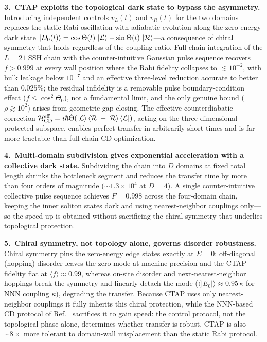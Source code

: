 \documentclass[
  reprint,
  amsmath,
  amssymb,
  aps,
  prb,
  floatfix,
  longbibliography,
]{revtex4-2}
\newcommand{\ketL}{\ket{\mathcal{L}}}
\newcommand{\ketR}{\ket{\mathcal{R}}}
\begin{document}
\textbf{3.~CTAP exploits the topological dark state to bypass the asymmetry.}
Introducing independent controls $v_L(t)$ and $v_R(t)$ for the two domains
replaces the static Rabi oscillation with adiabatic evolution along the
zero-energy dark state $\ket{D_0(t)} = \cos\Theta(t)\,\ketL -
\sin\Theta(t)\,\ketR$---a consequence of chiral symmetry that holds
regardless of the coupling ratio.
Full-chain integration of the $L=21$ SSH chain with the counter-intuitive
Gaussian pulse sequence recovers $f > 0.999$ at every wall position where the
Rabi fidelity collapses to $\lesssim10^{-2}$, with bulk leakage below
$10^{-7}$ and an effective three-level reduction accurate to better than
$0.025\%$; the residual infidelity is a removable pulse boundary-condition
effect ($f \leq \cos^2\Theta_0$), not a fundamental limit, and the only
genuine bound ($\rho \gtrsim 10^2$) arises from geometric gap closing.
The effective counterdiabatic correction
$\mathcal{H}_{\mathrm{CD}}^{\mathrm{eff}} = i\hbar\dot{\Theta}
(\ketL\bra{\mathcal{R}} - \ketR\bra{\mathcal{L}})$, acting on the
three-dimensional protected subspace, enables perfect transfer in arbitrarily
short times and is far more tractable than full-chain CD optimization.

\textbf{4.~Multi-domain subdivision gives exponential acceleration with a
collective dark state.}
Subdividing the chain into $D$ domains at fixed total length shrinks the
bottleneck segment and reduces the transfer time by more than four orders
of magnitude ($\sim\!1.3\times10^4$ at $D = 4$).
A single counter-intuitive collective pulse sequence achieves $F = 0.998$
across the four-domain chain, keeping the inner soliton states dark and
using nearest-neighbor couplings only---so the speed-up is obtained without
sacrificing the chiral symmetry that underlies topological protection.

\textbf{5.~Chiral symmetry, not topology alone, governs disorder robustness.}
Chiral symmetry pins the zero-energy edge states exactly at $E = 0$:
off-diagonal (hopping) disorder leaves the zero mode at machine precision and
the CTAP fidelity flat at $\langle f\rangle \approx 0.99$, whereas
on-site disorder and next-nearest-neighbor hoppings break the symmetry and
linearly detach the mode ($\langle|E_0|\rangle \approx 0.95\,\kappa$ for NNN
coupling $\kappa$), degrading the transfer.
Because CTAP uses only nearest-neighbor couplings it fully inherits this
chiral protection, while the NNN-based CD protocol of Ref.~\cite{Romero2024}
sacrifices it to gain speed: the control protocol, not the topological phase
alone, determines whether transfer is robust.
CTAP is also $\sim\!8\times$ more tolerant to domain-wall misplacement than
the static Rabi protocol.
\end{document}

